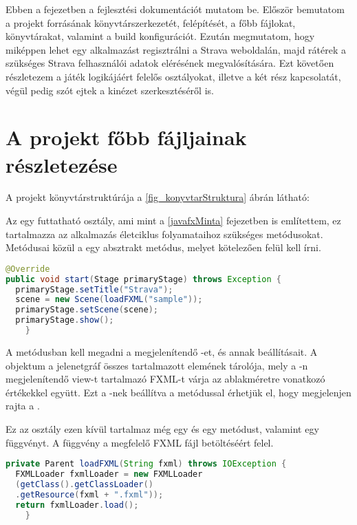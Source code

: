 Ebben a fejezetben a fejlesztési dokumentációt mutatom be.
Először bemutatom a projekt forrásának könyvtárszerkezetét, felépítését, a főbb fájlokat, könyvtárakat, valamint a build konfigurációt.
Ezután megmutatom, hogy miképpen lehet egy alkalmazást regisztrálni a Strava weboldalán, majd rátérek  a szükséges Strava felhasználói adatok elérésének megvalósítására.
Ezt követően részletezem a játék logikájáért felelős osztályokat, illetve a két rész kapcsolatát, végül pedig szót ejtek a kinézet szerkesztéséről is.

\section{A projekt főbb fájljainak részletezése}\label{fobbFajlok}


A projekt könyvtárstruktúrája a \ref{fig_konyvtarStruktura} ábrán látható:


Az  egy futtatható osztály, ami mint a \ref{javafxMinta} fejezetben is említettem, ez tartalmazza az alkalmazás életciklus folyamataihoz szükséges metódusokat.
Metódusai közül a  egy absztrakt metódus, melyet kötelezően felül kell írni.


\begin{lstlisting}[language=Java]
@Override
public void start(Stage primaryStage) throws Exception {
  primaryStage.setTitle("Strava");
  scene = new Scene(loadFXML("sample"));
  primaryStage.setScene(scene);
  primaryStage.show();
    }
\end{lstlisting}
 
A  metódusban kell megadni a megjelenítendő -et, és annak beállításait.
A  objektum a jelenetgráf összes tartalmazott elemének tárolója, mely a -n megjelenítendő view-t tartalmazó FXML-t várja az ablakméretre vonatkozó értékekkel együtt.
Ezt a -nek beállítva a  metódussal érhetjük el, hogy megjelenjen rajta a .

Ez az osztály ezen kívül tartalmaz még egy  és egy  metódust, valamint egy  függvényt.
A  függvény a megfelelő FXML fájl betöltéséért felel.

\begin{lstlisting}[language=Java]
private Parent loadFXML(String fxml) throws IOException {
  FXMLLoader fxmlLoader = new FXMLLoader
  (getClass().getClassLoader()
  .getResource(fxml + ".fxml"));
  return fxmlLoader.load();
    } 
\end{lstlisting}
 
